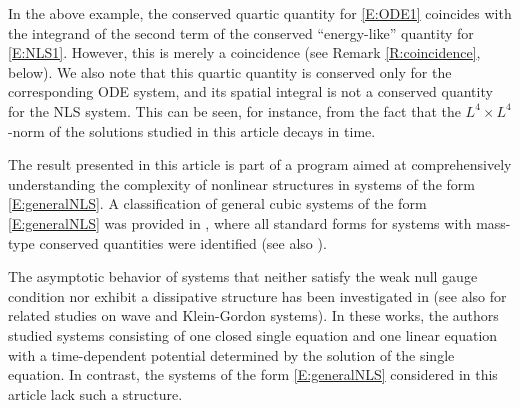 \documentclass[11pt,a4paper,oneside]{amsart}
\theoremstyle{plain}
\theoremstyle{remark}
\numberwithin{equation}{section}
\theoremstyle{definition}
\begin{document}

In the above example, the conserved quartic quantity for \eqref{E:ODE1} coincides with the integrand of the second term of the conserved “energy-like” quantity for \eqref{E:NLS1}. However, this is merely a coincidence (see Remark \ref{R:coincidence}, below). We also note that this quartic quantity is conserved only for the corresponding ODE system, and its spatial integral is not a conserved quantity for the NLS system. This can be seen, for instance, from the fact that the $L^4\times L^4$-norm of the solutions studied in this article decays in time.



%
The result presented in this article is part of a program aimed at comprehensively understanding the complexity of nonlinear structures in systems of the form \eqref{E:generalNLS}. A classification of general cubic systems of the form \eqref{E:generalNLS} was provided in \cite{MSU2,M}, where all standard forms for systems with mass-type conserved quantities were identified (see also \cite{M2,M3}).

The asymptotic behavior of systems that neither satisfy the weak null gauge condition nor exhibit a dissipative structure has been investigated in \cite{MSU2,KMSU} (see also \cite{KMS,MSU1} for related studies on wave and Klein-Gordon systems). In these works, the authors studied systems consisting of one closed single equation and one linear equation with a time-dependent potential determined by the solution of the single equation.
In contrast, the systems of the form \eqref{E:generalNLS} considered in this article lack such a structure.
\end{document}
